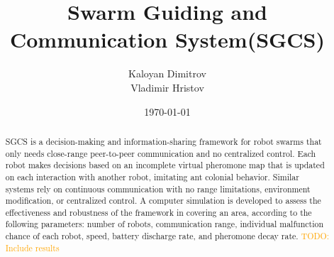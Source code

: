 \documentclass[a4paper, 12pt, times]{article}
\author{Kaloyan Dimitrov\\Vladimir Hristov}
\title{Swarm Guiding and Communication System(SGCS)}
\date{\today}
\newcommand{\todo}[1]{\textcolor{orange}{TODO: #1}}
\begin{document}
\maketitle
\begin{abstract}
SGCS is a decision-making and information-sharing framework for robot swarms that only needs close-range peer-to-peer communication and no centralized control. Each robot makes decisions based on an incomplete virtual pheromone map that is updated on each interaction with another robot, imitating ant colonial behavior. Similar systems rely on continuous communication with no range limitations, environment modification, or centralized control. A computer simulation is developed to assess the effectiveness and robustness of the framework in covering an area, according to the following parameters: number of robots, communication range, individual malfunction chance of each robot, speed, battery discharge rate, and pheromone decay rate. \todo{Include results}
\end{abstract}
\end{document}
